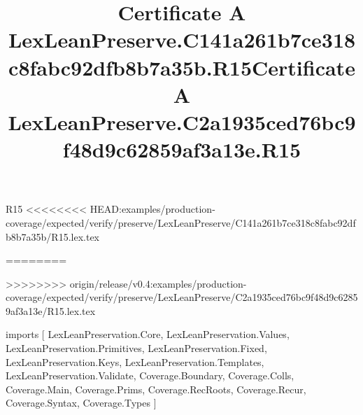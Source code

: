 \begin{lexlean}{R15}
<<<<<<<< HEAD:examples/production-coverage/expected/verify/preserve/LexLeanPreserve/C141a261b7ce318c8fabc92dfb8b7a35b/R15.lex.tex
\title{Certificate A LexLeanPreserve.C141a261b7ce318c8fabc92dfb8b7a35b.R15}
========
\title{Certificate A LexLeanPreserve.C2a1935ced76bc9f48d9c62859af3a13e.R15}
>>>>>>>> origin/release/v0.4:examples/production-coverage/expected/verify/preserve/LexLeanPreserve/C2a1935ced76bc9f48d9c62859af3a13e/R15.lex.tex
\begin{coremodule}
imports [
  LexLeanPreservation.Core,
  LexLeanPreservation.Values,
  LexLeanPreservation.Primitives,
  LexLeanPreservation.Fixed,
  LexLeanPreservation.Keys,
  LexLeanPreservation.Templates,
  LexLeanPreservation.Validate,
  Coverage.Boundary,
  Coverage.Colls,
  Coverage.Main,
  Coverage.Prims,
  Coverage.RecRoots,
  Coverage.Recur,
  Coverage.Syntax,
  Coverage.Types
]


\end{coremodule}
\end{lexlean}
